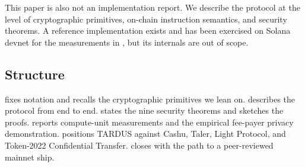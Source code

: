This paper is also not an implementation report. We describe the protocol at the level of cryptographic primitives, on-chain instruction semantics, and security theorems. A reference implementation exists and has been exercised on Solana devnet for the measurements in , but its internals are out of scope.

\subsection{Structure}

 fixes notation and recalls the cryptographic primitives we lean on.  describes the protocol from end to end.  states the nine security theorems and sketches the proofs.  reports compute-unit measurements and the empirical fee-payer privacy demonstration.  positions TARDUS against Cashu, Taler, Light Protocol, and Token-2022 Confidential Transfer.  closes with the path to a peer-reviewed mainnet ship.
